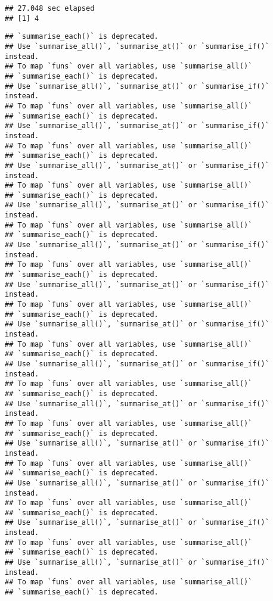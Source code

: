\documentclass[]{article}
\begin{document}
\begin{verbatim}
## 27.048 sec elapsed
## [1] 4
\end{verbatim}

\begin{verbatim}
## `summarise_each()` is deprecated.
## Use `summarise_all()`, `summarise_at()` or `summarise_if()` instead.
## To map `funs` over all variables, use `summarise_all()`
## `summarise_each()` is deprecated.
## Use `summarise_all()`, `summarise_at()` or `summarise_if()` instead.
## To map `funs` over all variables, use `summarise_all()`
## `summarise_each()` is deprecated.
## Use `summarise_all()`, `summarise_at()` or `summarise_if()` instead.
## To map `funs` over all variables, use `summarise_all()`
## `summarise_each()` is deprecated.
## Use `summarise_all()`, `summarise_at()` or `summarise_if()` instead.
## To map `funs` over all variables, use `summarise_all()`
## `summarise_each()` is deprecated.
## Use `summarise_all()`, `summarise_at()` or `summarise_if()` instead.
## To map `funs` over all variables, use `summarise_all()`
## `summarise_each()` is deprecated.
## Use `summarise_all()`, `summarise_at()` or `summarise_if()` instead.
## To map `funs` over all variables, use `summarise_all()`
## `summarise_each()` is deprecated.
## Use `summarise_all()`, `summarise_at()` or `summarise_if()` instead.
## To map `funs` over all variables, use `summarise_all()`
## `summarise_each()` is deprecated.
## Use `summarise_all()`, `summarise_at()` or `summarise_if()` instead.
## To map `funs` over all variables, use `summarise_all()`
## `summarise_each()` is deprecated.
## Use `summarise_all()`, `summarise_at()` or `summarise_if()` instead.
## To map `funs` over all variables, use `summarise_all()`
## `summarise_each()` is deprecated.
## Use `summarise_all()`, `summarise_at()` or `summarise_if()` instead.
## To map `funs` over all variables, use `summarise_all()`
## `summarise_each()` is deprecated.
## Use `summarise_all()`, `summarise_at()` or `summarise_if()` instead.
## To map `funs` over all variables, use `summarise_all()`
## `summarise_each()` is deprecated.
## Use `summarise_all()`, `summarise_at()` or `summarise_if()` instead.
## To map `funs` over all variables, use `summarise_all()`
## `summarise_each()` is deprecated.
## Use `summarise_all()`, `summarise_at()` or `summarise_if()` instead.
## To map `funs` over all variables, use `summarise_all()`
## `summarise_each()` is deprecated.
## Use `summarise_all()`, `summarise_at()` or `summarise_if()` instead.
## To map `funs` over all variables, use `summarise_all()`
## `summarise_each()` is deprecated.

\end{verbatim}
\end{document}
